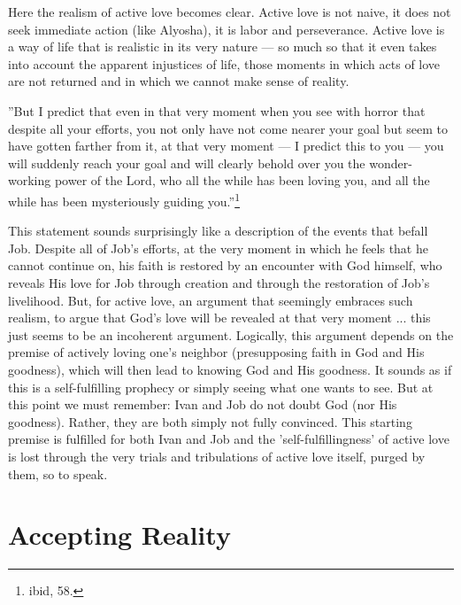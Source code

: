 Here the realism of active love becomes clear. Active love is not naive, it does not seek immediate action (like Alyosha), it is labor and perseverance. Active love is a way of life that is realistic in its very nature --- so much so that it even takes into account the apparent injustices of life, those moments in which acts of love are not returned and in which we cannot make sense of reality. 

''But I predict that even in that very moment when you see with horror that despite all your efforts, you not only have not come nearer your goal but seem to have gotten farther from it, at that very moment --- I predict this to you --- you will suddenly reach your goal and will clearly behold over you the wonder-working power of the Lord, who all the while has been loving you, and all the while has been mysteriously guiding you.''\footnote{ibid, 58.}

This statement sounds surprisingly like a description of the events that befall Job. Despite all of Job's efforts, at the very moment in which he feels that he cannot continue on, his faith is restored by an encounter with God himself, who reveals His love for Job through creation and through the restoration of Job's livelihood. But, for active love, an argument that seemingly embraces such realism, to argue that God's love will be revealed at that very moment ... this just seems to be an incoherent argument. Logically, this argument depends on the premise of actively loving one's neighbor (presupposing faith in God and His goodness), which will then lead to knowing God and His goodness. It sounds as if this is a self-fulfilling prophecy or simply seeing what one wants to see. But at this point we must remember: Ivan and Job do not doubt God (nor His goodness). Rather, they are both simply not fully convinced. This starting premise is fulfilled for both Ivan and Job and the 'self-fulfillingness' of active love is lost through the very trials and tribulations of active love itself, purged by them, so to speak.

\chapter{Accepting Reality}
